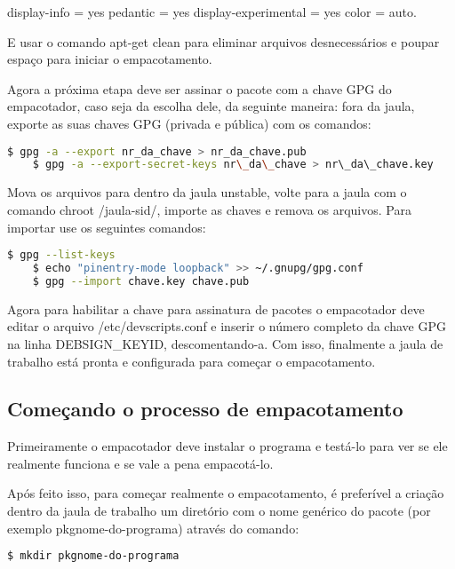 display-info = yes 
pedantic = yes 
display-experimental = yes 
color = auto.

E usar o comando apt-get clean para eliminar arquivos desnecessários e poupar espaço para iniciar o empacotamento.

Agora a próxima etapa deve ser assinar o pacote com a chave GPG do empacotador, caso seja da escolha dele, da seguinte maneira: fora da jaula, exporte as suas chaves GPG (privada e pública) com os comandos:

\begin{lstlisting}[language=bash]
	$ gpg -a --export nr_da_chave > nr_da_chave.pub 
	$ gpg -a --export-secret-keys nr\_da\_chave > nr\_da\_chave.key
\end{lstlisting} 

Mova os arquivos para dentro da jaula unstable, volte para a jaula com o comando chroot /jaula-sid/, importe as chaves e remova os arquivos. Para importar use os seguintes comandos: 

\begin{lstlisting}[language=bash]
	$ gpg --list-keys 
	$ echo "pinentry-mode loopback" >> ~/.gnupg/gpg.conf 
	$ gpg --import chave.key chave.pub 
\end{lstlisting}

Agora para habilitar a chave para assinatura de pacotes o empacotador deve editar o arquivo /etc/devscripts.conf e inserir o número completo da chave GPG na linha DEBSIGN\_KEYID, descomentando-a. Com isso, finalmente a jaula de trabalho está pronta e configurada para começar o empacotamento.

\subsection{Começando o processo de empacotamento}

Primeiramente o empacotador deve instalar o programa e testá-lo para ver se ele realmente funciona e se vale a pena empacotá-lo.

Após feito isso, para começar realmente o empacotamento, é preferível a criação dentro da jaula de trabalho um diretório com o nome genérico do pacote (por exemplo pkgnome-do-programa) através do comando:

\begin{lstlisting}[language=bash]
	$ mkdir pkgnome-do-programa 
\end{lstlisting} 

